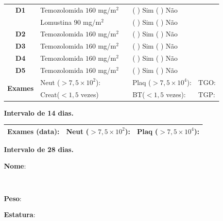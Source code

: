 \documentclass[11pt,a4paper,oldfontcommands]{memoir}
\def\entrywithlabel[#1]#2{\parbox{#1}{{\small #2:} \hrulefill}}
\begin{document}
\begin{center}
\begin{table}[H]
\begin{tabular}{p{1cm}p{5cm}|p{1cm}|p{4.5cm}|p{2cm}}
    \hline
    \multicolumn{1}{c|}{\multirow{1}{*}{\textbf{D1}}}&{Temozolomida \(160\) mg/m\(^2\)}&&{(  ) Sim (  ) Não}&\\
    \multicolumn{1}{c|}{\multirow{1}{*}{\textbf{}}}&{Lomustina \(90\) mg/m\(^2\)}&&{(  ) Sim (  ) Não}&\\
    \multicolumn{1}{c|}{\multirow{1}{*}{\textbf{D2}}}&{Temozolomida \(160\) mg/m\(^2\)}&&{(  ) Sim (  ) Não}&\\
    \multicolumn{1}{c|}{\multirow{1}{*}{\textbf{D3}}}&{Temozolomida \(160\) mg/m\(^2\)}&&{(  ) Sim (  ) Não}&\\
    \multicolumn{1}{c|}{\multirow{1}{*}{\textbf{D4}}}&{Temozolomida \(160\) mg/m\(^2\)}&&{(  ) Sim (  ) Não}&\\
    \multicolumn{1}{c|}{\multirow{1}{*}{\textbf{D5}}}&{Temozolomida \(160\) mg/m\(^2\)}&&{(  ) Sim (  ) Não}&\\
    \hline
    \multicolumn{1}{c|}{\multirow{2}{*}{\textbf{Exames}}}&\multicolumn{2}{l|}{Neut (\(>7,5\times10^2\)):}&{Plaq (\(>7,5\times10^4\)):}&{TGO:}\\
    \cline{2-5}
    \multicolumn{1}{c|}{\multirow{2}{*}{{}}}&\multicolumn{2}{l|}{Creat(\(<1,5\) vezes)}&{BT(\(<1,5\) vezes):}&{TGP:}
    \\
    \hline
\end{tabular}
\end{table}
\textbf{Intervalo de 14 dias.}
\begin{table}[H]
\begin{tabular}{p{5cm}|p{5cm}|p{4.7cm}}
    \hline
    \textbf{Exames (data):}&{Neut (\(>7,5\times10^2\)):}&{Plaq (\(>7,5\times10^4\)):}
    \\
    \hline
\end{tabular}
\end{table}
\textbf{Intervalo de 28 dias.}

\pagebreak
    \noindent
\entrywithlabel[1\hsize]{\textbf{Nome}}\hfill
\\[0.3cm]
\entrywithlabel[.45\hsize]{\textbf{Peso}}\hfill  \entrywithlabel[.45\hsize]{\textbf{Estatura}}


\end{center}
\end{document}
